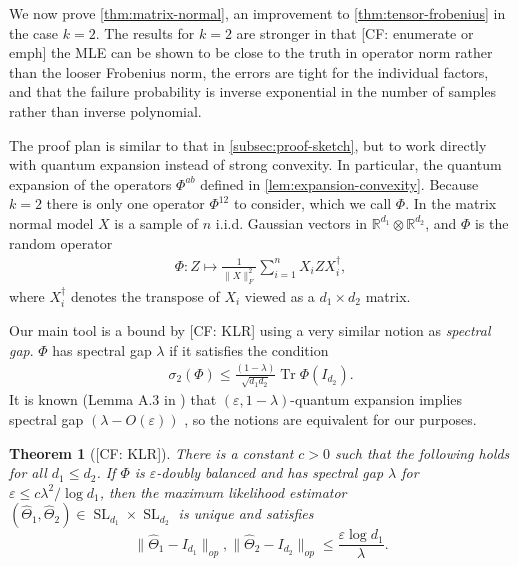 \documentclass[aos]{imsart}
\newtheorem{theorem}{Theorem}[section]
\theoremstyle{definition}
\numberwithin{equation}{section}
\DeclareMathOperator{\tr}{Tr}
\newcommand{\R}{{\mathbb{R}}}
\newcommand{\ot}{\otimes}
\newcommand{\eps}{\varepsilon}
\newcommand{\SL}{\operatorname{SL}}
\newcommand{\CF}[1]{{\color{purple}[CF: #1]}}
\begin{document}
We now prove \cref{thm:matrix-normal}, an improvement to \cref{thm:tensor-frobenius} in the case $k=2$. The results for $k = 2$ are stronger in that \CF{enumerate or emph} the MLE can be shown to be close to the truth in operator norm rather than the looser Frobenius norm, the errors are tight for the individual factors, and that the failure probability is inverse exponential in the number of samples rather than inverse polynomial.

The proof plan is similar to that in \cref{subsec:proof-sketch}, but to work directly with quantum expansion instead of strong convexity. In particular, the quantum expansion of the operators $\Phi^{ab}$ defined in \cref{lem:expansion-convexity}. Because $k = 2$ there is only one operator $\Phi^{12}$ to consider, which we call $\Phi$. In the matrix normal model $X$ is a sample of $n$ i.i.d. Gaussian vectors in $\R^{d_1} \ot \R^{d_2}$, and $\Phi$ is the random operator
\begin{align}\Phi:Z \mapsto \frac{1}{\|X\|_F^2} \sum_{i = 1}^n X_i Z X_i^\dagger,\label{eq:matrix-normal-operator}\end{align}
where $X_i^\dagger$ denotes the transpose of $X_i$ viewed as a $d_1\times d_2$ matrix. 

Our main tool is a bound by \CF{KLR} using a very similar notion as \emph{spectral gap}. $\Phi$ has spectral gap $ \lambda$ if it satisfies the condition 
\begin{align}\sigma_2(\Phi) \leq \frac{(1 - \lambda)}{\sqrt{d_1d_2}} \tr \Phi(I_{d_2}).\label{eq:spectral-gap}
\end{align}
It is known (Lemma A.3 in \cite{FM20}) that $(\eps, 1 - \lambda)$-quantum expansion implies spectral gap $(\lambda - O(\eps))$ , so the notions are equivalent for our purposes. 



\begin{theorem}[\CF{KLR}]\label{thm:klr} There is a constant $c > 0$ such that the following holds for all $d_1 \leq d_2$.
If $\Phi$ is $\eps$-doubly balanced and has spectral gap $\lambda$ for $\eps \leq c \lambda^2/\log d_1$, then the maximum likelihood estimator $(\widehat{\Theta}_1, \widehat{\Theta}_2) \in \SL_{d_1}\times \SL_{d_2}$ is unique and satisfies
$$\| \widehat{\Theta}_1 - I_{d_1}\|_{op}, \| \widehat{\Theta}_2 - I_{d_2}\|_{op} \leq \frac{\eps \log d_1}{\lambda}.$$
\end{theorem}
\end{document}
